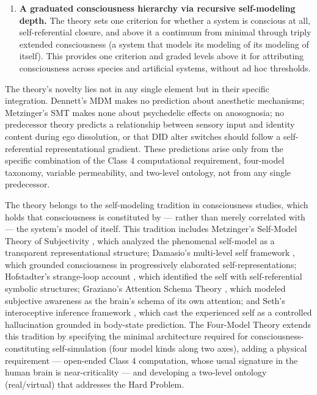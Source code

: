 \documentclass[12pt]{article}
\newcommand{\revstart}{}
\newcommand{\revend}{}
\begin{document}
\begin{enumerate}
\item \textbf{A graduated consciousness hierarchy via recursive self-modeling depth.} The theory sets one criterion for whether a system is conscious at all, self-referential closure, and above it a continuum from minimal through triply extended consciousness (a system that models its modeling of its modeling of itself). This provides one criterion and graded levels above it for attributing consciousness across species and artificial systems, without ad hoc thresholds.
\end{enumerate}

{\revstart The theory's novelty lies not in any single element but in their specific integration. Dennett's MDM makes no prediction about anesthetic mechanisms; Metzinger's SMT makes none about psychedelic effects on anosognosia; no predecessor theory predicts a relationship between sensory input and identity content during ego dissolution, or that DID alter switches should follow a self-referential representational gradient. These predictions arise only from the specific combination of the Class 4 computational requirement, four-model taxonomy, variable permeability, and two-level ontology, not from any single predecessor.\revend}

The theory belongs to the self-modeling tradition in consciousness studies, which holds that consciousness is constituted by --- rather than merely correlated with --- the system's model of itself. This tradition includes Metzinger's Self-Model Theory of Subjectivity \citep{Metzinger2003,Metzinger2009}, which analyzed the phenomenal self-model as a transparent representational structure; Damasio's multi-level self framework \citep{Damasio1999,Damasio2010}, which grounded consciousness in progressively elaborated self-representations; Hofstadter's strange-loop account \citep{Hofstadter2007}, which identified the self with self-referential symbolic structures; Graziano's Attention Schema Theory \citep{Graziano2013}, which modeled subjective awareness as the brain's schema of its own attention; and Seth's interoceptive inference framework \citep{Seth2021,SethBayne2022}, which cast the experienced self as a controlled hallucination grounded in body-state prediction. The Four-Model Theory extends this tradition by specifying the minimal architecture required for consciousness-constituting self-simulation (four model kinds along two axes), adding a physical requirement --- open-ended Class 4 computation, whose usual signature in the human brain is near-criticality --- and developing a two-level ontology (real/virtual) that addresses the Hard Problem.
\end{document}
